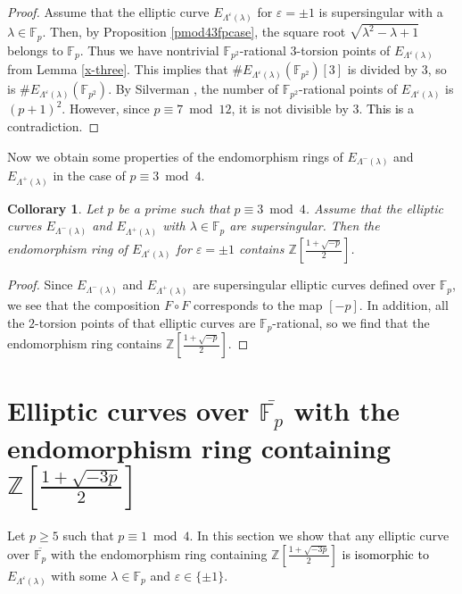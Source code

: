 \documentclass[a4paper, 11pt]{article}
\theoremstyle{plain}
\newtheorem{cor}[defn]{Collorary}
\newcommand{\?}{\textcolor{red}{??}}
\newcommand{\lm}{\lambda}
\newcommand{\Lm}{\Lambda}
\newcommand{\fp}{\mathbb{F}_p}
\newcommand{\fpp}{\mathbb{F}_{p^2}}
\newcommand{\bZ}{\mathbb{Z}}
\begin{document}
\begin{proof}
    Assume that the elliptic curve $ E_{\Lambda^{\varepsilon}(\lm)}$ for $\varepsilon=\pm1$ is supersingular with a $\lm \in \fp$. Then, by Proposition \ref{pmod43fpcase}, the square root $\sqrt{{\lm}^2-\lm+1}$ belongs to $\fp$. Thus we have nontrivial $\fpp$-rational $3$-torsion points of $E_{\Lambda^{\varepsilon}(\lm)}$ from Lemma \ref{x-three}. This implies that $\#E_{\Lambda^{\varepsilon}(\lm)}(\fpp)[3]$ is divided by $3$, so is $\#E_{\Lambda^{\varepsilon}(\lm)}(\fpp)$. By Silverman \cite[\S 5 p.155 5.15]{AEC}, the number of $\fpp$-rational points of $E_{\Lambda^{\varepsilon}(\lm)}$ is $(p+1)^2$.  However, since $p \equiv 7 \bmod 12$, it is not divisible by $3$. \textcolor{black}{This is} a contradiction. 
\end{proof}
Now we obtain some properties of the endomorphism rings of $E_{\Lm^{-}(\lm)}$ and $E_{\Lm^{+}(\lm)}$ in the case of $p \equiv 3\bmod 4$. 
\begin{cor}
  Let $p$ be a prime such that $p \equiv 3 \bmod 4$.  Assume that the elliptic curves $ E_{\Lambda^{-}(\lm)}$ and $ E_{{\Lambda^{+}(\lm)}}$ with $\lm \in \fp$ are supersingular. Then the endomorphism ring of $ E_{\Lambda^{\varepsilon}(\lm)}$ for $\varepsilon=\pm1$ contains $\bZ \left[ \frac{1+\sqrt{-p}}{2}\right]$.
\end{cor}

\begin{proof}
    Since $ E_{\Lambda^{-}(\lm)}$ and $ E_{{\Lambda^{+}(\lm)}}$ are supersingular elliptic curves defined over $\fp$, we see that the composition $F \circ F$ corresponds to the map $[-p]$. In addition, all the $2$-torsion points of that elliptic curves are $\fp$-rational, so we find that the endomorphism ring contains $\bZ \left[ \frac{1+\sqrt{-p}}{2}\right]$.
\end{proof}

\section{Elliptic curves over $\overline{\fp}$ with the endomorphism ring containing $\bZ \left[ \frac{1+\sqrt{-3p}}{2}\right]$}
\label{with Endomorphism containing}
Let $p\ge 5$ such that $p\equiv1\bmod4$. In this section we show that any elliptic curve over $\overline{\fp}$ with the endomorphism ring containing $\bZ \left[ \frac{1+\sqrt{-3p}}{2}\right]$ \textcolor{black}{is isomorphic to}  $E_{\Lm^{\varepsilon}(\lm)}$ with some $\lm \in \fp$ and $\varepsilon\in\{\pm1\}$.
\end{document}

